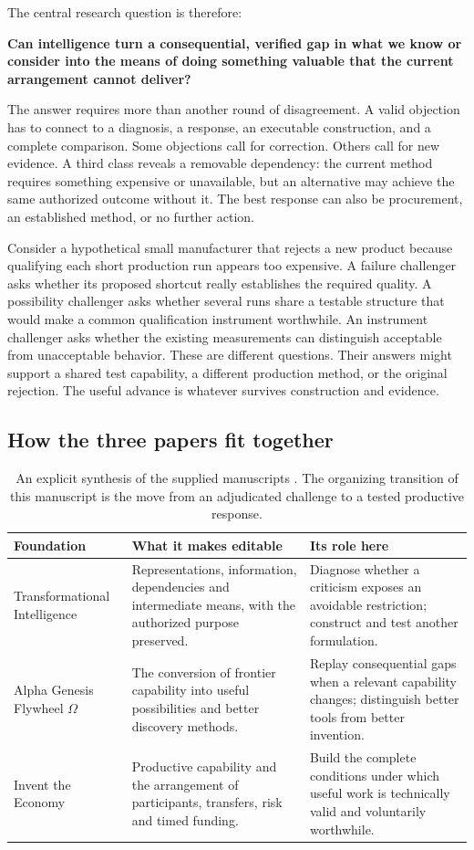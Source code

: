 The central research question is therefore:
\begin{thesisbox}
\textbf{Can intelligence turn a consequential, verified gap in what we know or consider into the means of doing something valuable that the current arrangement cannot deliver?}
\end{thesisbox}
The answer requires more than another round of disagreement. A valid objection has to connect to a diagnosis, a response, an executable construction, and a complete comparison. Some objections call for correction. Others call for new evidence. A third class reveals a removable dependency: the current method requires something expensive or unavailable, but an alternative may achieve the same authorized outcome without it. The best response can also be procurement, an established method, or no further action.

Consider a hypothetical small manufacturer that rejects a new product because qualifying each short production run appears too expensive. A failure challenger asks whether its proposed shortcut really establishes the required quality. A possibility challenger asks whether several runs share a testable structure that would make a common qualification instrument worthwhile. An instrument challenger asks whether the existing measurements can distinguish acceptable from unacceptable behavior. These are different questions. Their answers might support a shared test capability, a different production method, or the original rejection. The useful advance is whatever survives construction and evidence.

\subsection{How the three papers fit together}
\begin{table}[htbp]
\small
\begin{tabularx}{\textwidth}{P{1.48in}YY}
\toprule
\textbf{Foundation} & \textbf{What it makes editable} & \textbf{Its role here}\\
\midrule
Transformational Intelligence & Representations, information, dependencies and intermediate means, with the authorized purpose preserved. & Diagnose whether a criticism exposes an avoidable restriction; construct and test another formulation.\\
Alpha Genesis Flywheel $\Omega$ & The conversion of frontier capability into useful possibilities and better discovery methods. & Replay consequential gaps when a relevant capability changes; distinguish better tools from better invention.\\
Invent the Economy & Productive capability and the arrangement of participants, transfers, risk and timed funding. & Build the complete conditions under which useful work is technically valid and voluntarily worthwhile.\\
\bottomrule
\end{tabularx}
\caption{An explicit synthesis of the supplied manuscripts \citep{boucher_ti,boucher_genesis,boucher_economy}. The organizing transition of this manuscript is the move from an adjudicated challenge to a tested productive response.}
\end{table}

